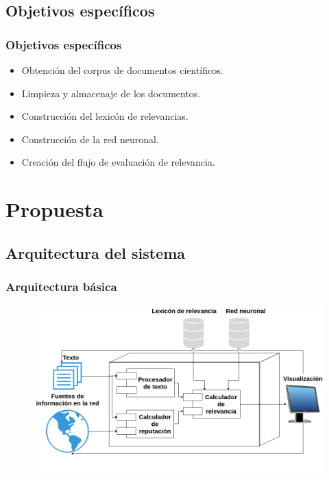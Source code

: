 \documentclass[10pt,fleqn]{beamer}
\begin{document}
\subsection{Objetivos específicos}
\begin{frame}\frametitle{Objetivos específicos} 
\begin{itemize}
\item Obtención del corpus de documentos científicos. 
\item Limpieza y almacenaje de los documentos.
\item Construcción del lexicón de relevancias.
\item Construcción de la red neuronal.
\item Creación del flujo de evaluación de relevancia.
\end{itemize}
\end{frame}


\section{Propuesta}
\subsection{Arquitectura del sistema}

\begin{frame}\frametitle{Arquitectura básica} 
\begin{figure}
  \centering
  \includegraphics[width=12cm, keepaspectratio]{images/arc_esp.png}
\end{figure}
\end{frame}
\end{document}
